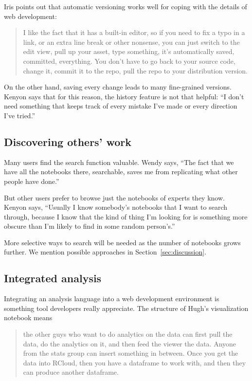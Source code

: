 
Iris points out that automatic versioning works well for coping with
the details of web development:
\begin{quote}
I like the fact that it has a built-in editor, so
if you need to fix a typo in a link, or an extra line break or other
nonsense, you can just switch to the edit view, pull up your asset, type
something, it's automatically saved, committed, everything. You don't have to go
back to your source code, change it, commit it to the repo, pull the repo to
your distribution version. 
\end{quote}

On the other hand, saving every change leads to many fine-grained
versions. Kenyon says that for this reason, the history feature is not that
helpful: ``I don't need something that keeps track of every mistake I've made or
every direction I've tried.''


\subsection{Discovering others' work}
Many users find the search function valuable. Wendy says, ``The fact that we have
all the notebooks there, searchable, saves me from replicating what other people
have done.''

But other users prefer to browse just the notebooks of experts they
know. Kenyon says, ``Usually I know somebody's notebooks that I want to search
through, because I know that the kind of thing I'm looking for is something
more obscure than I'm likely to find in some random person's.''

More selective ways to search will be needed as the number of notebooks
grows further. We mention possible approaches in Section~\ref{sec:discussion}.

\subsection{Integrated analysis}
Integrating an analysis language into a web development environment is something
tool developers really appreciate. The structure of Hugh's visualization
notebook means
\begin{quote}
the other guys who want to do analytics on the data can first pull
the data, do the analytics on it, and then feed the viewer the data.
Anyone from the stats group can insert something in between.
Once you get the data into RCloud, then you have a dataframe
to work with, and then they can produce another dataframe.
\end{quote}

